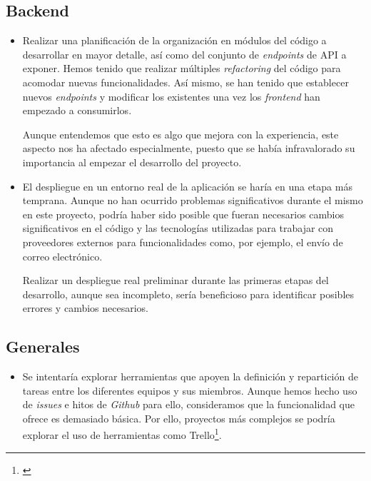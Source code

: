 \documentclass[11pt, a4paper, titlepage]{article}
\begin{document}
\subsection{Backend}
\begin{itemize}
    \item Realizar una planificación de la organización en módulos del código a desarrollar en mayor detalle, así como del conjunto de \textit{endpoints} de API a exponer. Hemos tenido que realizar múltiples \textit{refactoring} del código para acomodar nuevas funcionalidades. Así mismo, se han tenido que establecer nuevos \textit{endpoints} y modificar los existentes una vez los \textit{frontend} han empezado a consumirlos.
    
    Aunque entendemos que esto es algo que mejora con la experiencia, este aspecto nos ha afectado especialmente, puesto que se había infravalorado su importancia al empezar el desarrollo del proyecto.
    
    \item El despliegue en un entorno real de la aplicación se haría en una etapa más temprana. Aunque no han ocurrido problemas significativos durante el mismo en este proyecto, podría haber sido posible que fueran necesarios cambios significativos en el código y las tecnologías utilizadas para trabajar con proveedores externos para funcionalidades como, por ejemplo, el envío de correo electrónico.
    
    Realizar un despliegue real preliminar durante las primeras etapas del desarrollo, aunque sea incompleto, sería beneficioso para identificar posibles errores y cambios necesarios.
\end{itemize}

\subsection{Generales}
\begin{itemize}
    \item Se intentaría explorar herramientas que apoyen la definición y repartición de tareas entre los diferentes equipos y sus miembros. Aunque hemos hecho uso de \textit{issues} e hitos de \textit{Github} para ello, consideramos que la funcionalidad que ofrece es demasiado básica. Por ello, proyectos más complejos se podría explorar el uso de herramientas como Trello\footnote{\href{https://trello.com/es}{}}.
\end{itemize}
\end{document}
